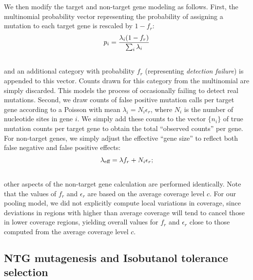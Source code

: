 \documentclass[letterpaper,10pt,english]{howto}
\begin{document}
We then modify the target and non-target gene modeling as follows.
First, the multinomial probability vector representing the probability
of assigning a mutation to each target gene is rescaled by
$1-f_r$:
\begin{gather}
\begin{split}p_i = \frac{\lambda_i(1-f_r)}{\sum_i{\lambda_i}}\end{split}\notag\\\begin{split}\end{split}\notag
\end{gather}
and an additional category with probability $f_r$
(representing \emph{detection failure}) is
appended to this vector.  Counts drawn for this category
from the multinomial are simply discarded.  This models the process
of occasionally failing to detect real mutations.  Second,
we draw counts of false positive mutation calls per target gene
according to a Poisson with mean $\lambda_i=N_i\epsilon_r$,
where $N_i$ is the number of nucleotide sites in gene $i$.
We simply add these counts to
the vector $\{n_i\}$ of true mutation counts per target gene
to obtain the total ``observed counts'' per gene.
For non-target genes, we simply adjust the effective ``gene size''
to reflect both false negative and false positive effects:
\begin{gather}
\begin{split}\lambda_{\text{eff}} = \lambda f_r + N_i\epsilon_r;\end{split}\notag\\\begin{split}\end{split}\notag
\end{gather}
other aspects of the non-target gene calculation are performed
identically.  Note that the values of $f_r$ and $\epsilon_r$
are based on the average coverage level $c$.
For our pooling model, we did not
explicitly compute local variations in coverage, since deviations in
regions with higher than average coverage will tend to cancel
those in lower coverage regions, yielding overall values for
$f_r$ and $\epsilon_r$ close to those computed
from the average coverage level $c$.


\subsection{NTG mutagenesis and Isobutanol tolerance selection}
\end{document}
